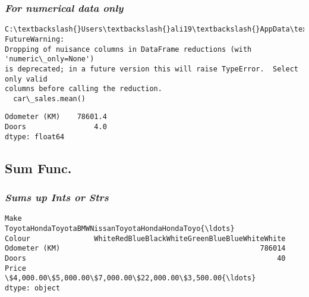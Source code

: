 \documentclass[11pt]{article}
\begin{document}
\hypertarget{for-numerical-data-only}{%
\subsubsection{\texorpdfstring{\textbf{\emph{For numerical data
only}}}{For numerical data only}}\label{for-numerical-data-only}}

    \begin{Verbatim}[commandchars=\\\{\}]
C:\textbackslash{}Users\textbackslash{}ali19\textbackslash{}AppData\textbackslash{}Local\textbackslash{}Temp/ipykernel\_9412/4073448239.py:1: FutureWarning:
Dropping of nuisance columns in DataFrame reductions (with 'numeric\_only=None')
is deprecated; in a future version this will raise TypeError.  Select only valid
columns before calling the reduction.
  car\_sales.mean()
    \end{Verbatim}

            \begin{tcolorbox}[breakable, size=fbox, boxrule=.5pt, pad at break*=1mm, opacityfill=0]
\begin{Verbatim}[commandchars=\\\{\}]
Odometer (KM)    78601.4
Doors                4.0
dtype: float64
\end{Verbatim}
\end{tcolorbox}
        
    \hypertarget{sum-func.}{%
\subsection{\texorpdfstring{\textbf{Sum
Func.}}{Sum Func.}}\label{sum-func.}}

\hypertarget{sums-up-ints-or-strs}{%
\subsubsection{\texorpdfstring{\textbf{\emph{Sums up Ints or
Strs}}}{Sums up Ints or Strs}}\label{sums-up-ints-or-strs}}

            \begin{tcolorbox}[breakable, size=fbox, boxrule=.5pt, pad at break*=1mm, opacityfill=0]
\begin{Verbatim}[commandchars=\\\{\}]
Make             ToyotaHondaToyotaBMWNissanToyotaHondaHondaToyo{\ldots}
Colour               WhiteRedBlueBlackWhiteGreenBlueBlueWhiteWhite
Odometer (KM)                                               786014
Doors                                                           40
Price            \$4,000.00\$5,000.00\$7,000.00\$22,000.00\$3,500.00{\ldots}
dtype: object
\end{Verbatim}
\end{tcolorbox}
        
\end{document}
